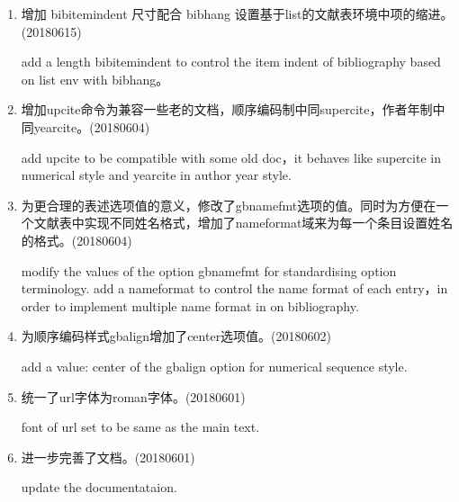 

\label{up:180601}
\begin{enumerate}
\item 增加 bibitemindent 尺寸配合 bibhang 设置基于list的文献表环境中项的缩进。(20180615)

add a length bibitemindent to control the item indent of bibliography based on list env with bibhang。

\item 增加upcite命令为兼容一些老的文档，顺序编码制中同supercite，作者年制中同yearcite。(20180604)

add upcite to be compatible with some old doc，it behaves like supercite in numerical style and yearcite in author year style.

\item 为更合理的表述选项值的意义，修改了gbnamefmt选项的值。同时为方便在一个文献表中实现不同姓名格式，增加了nameformat域来为每一个条目设置姓名的格式。(20180604)

modify the values of the option gbnamefmt for standardising option terminology. add a nameformat to control the name format of each entry，in order to implement multiple name format in on bibliography.

\item 为顺序编码样式gbalign增加了center选项值。(20180602)

add a value: center of the gbalign option for numerical sequence style.

\item 统一了url字体为roman字体。(20180601)

font of url set to be same as the main text.


\item 进一步完善了文档。(20180601)

update the documentataion.
\end{enumerate}


